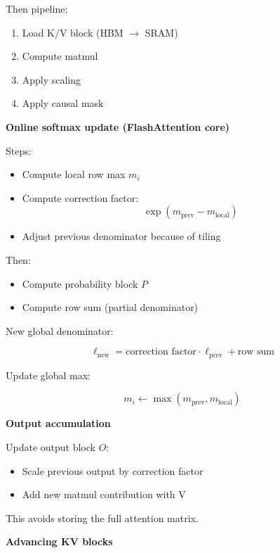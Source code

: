 \documentclass[11pt]{article}
\begin{document}
Then pipeline:

\begin{enumerate}
\item Load K/V block (HBM $\rightarrow$ SRAM)
\item Compute matmul
\item Apply scaling
\item Apply causal mask
\end{enumerate}

\textbf{Online softmax update (FlashAttention core)}

Steps:

\begin{itemize}
\item Compute local row max $m_i$
\item Compute correction factor:
\[
\exp(m_{\text{prev}} - m_{\text{local}})
\]
\item Adjust previous denominator because of tiling
\end{itemize}

Then:

\begin{itemize}
\item Compute probability block $P$
\item Compute row sum (partial denominator)
\end{itemize}

New global denominator:

\[
\ell_{\text{new}} =
\text{correction factor} \cdot \ell_{\text{prev}} +
\text{row sum}
\]

Update global max:

\[
m_i \leftarrow \max(m_{\text{prev}}, m_{\text{local}})
\]

\textbf{Output accumulation}

Update output block $O$:

\begin{itemize}
\item Scale previous output by correction factor
\item Add new matmul contribution with V
\end{itemize}

This avoids storing the full attention matrix.

\textbf{Advancing KV blocks}
\end{document}
